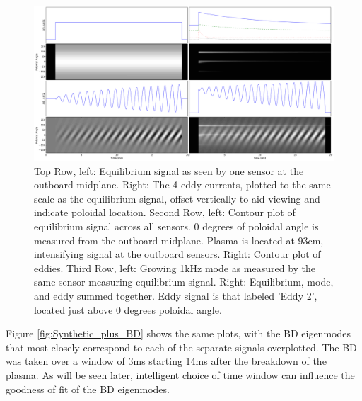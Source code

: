 \begin{figure}
\includegraphics[width = \textwidth]{./figures/Artificial_Signal.png}
\caption{Top Row, left: Equilibrium signal as seen by one sensor at the outboard midplane.  Right: The 4 eddy currents, plotted to the same scale as the equilibrium signal, offset vertically to aid viewing and indicate poloidal location.  Second Row, left: Contour plot of equilibrium signal across all sensors.  0 degrees of poloidal angle is measured from the outboard midplane.  Plasma is located at 93cm, intensifying signal at the outboard sensors.  Right: Contour plot of eddies.  Third Row, left:  Growing 1kHz mode as measured by the same sensor measuring equilibrium signal.  Right: Equilibrium, mode, and eddy summed together.  Eddy signal is that labeled 'Eddy 2', located just above 0 degrees poloidal angle.}\label{fig:Synthetic_signals}

\end{figure}

Figure \ref{fig:Synthetic_plus_BD} shows the same plots, with the BD eigenmodes that most closely correspond to each  of the separate signals overplotted.  The BD was taken over a window of 3ms starting 14ms after the breakdown of the plasma.  As will be seen later, intelligent choice of time window can influence the goodness of fit of the BD eigenmodes.

